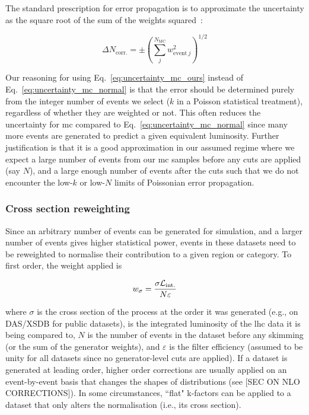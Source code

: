 The standard prescription for error propagation is to approximate the uncertainty as the square root of the sum of the weights squared~\cite{bevington2003data}:

\begin{equation}
\Delta N_{\mathrm{corr.}} = \pm \left( \sum_j^{N_{\mathrm{MC}}} w_{\mathrm{event} \ j}^2 \right) ^{1/2}
\label{eq:uncertainty_mc_normal}
\end{equation}

Our reasoning for using Eq.~\ref{eq:uncertainty_mc_ours} instead of Eq.~\ref{eq:uncertainty_mc_normal} is that the error should be determined purely from the integer number of events we select ($k$ in a Poisson statistical treatment), regardless of whether they are weighted or not. This often reduces the uncertainty for \acrshort{mc} compared to Eq.~\ref{eq:uncertainty_mc_normal} since many more events are generated to predict a given equivalent luminosity. Further justification is that it is a good approximation in our assumed regime where we expect a large number of events from our \acrshort{mc} samples before any cuts are applied (say $N$), and a large enough number of events after the cuts such that we do not encounter the low-$k$ or low-$N$ limits of Poissonian error propagation.




\subsubsection{Cross section reweighting}
\label{subsubsec:xs_weighting}

Since an arbitrary number of events can be generated for simulation, and a larger number of events gives higher statistical power, events in these datasets need to be reweighted to normalise their contribution to a given region or category. To first order, the weight applied is

\begin{equation}
w_{\sigma} = \frac{ \sigma \mathcal{L}_{\mathrm{int.}} }{ N \varepsilon }
\end{equation}

where $\sigma$ is the cross section of the process at the order it was generated (e.g., on DAS/XSDB for public datasets), \intlumi is the integrated luminosity of the \acrshort{lhc} data it is being compared to, $N$ is the number of events in the dataset before any skimming (or the sum of the generator weights), and $\varepsilon$ is the filter efficiency (assumed to be unity for all datasets since no generator-level cuts are applied). If a dataset is generated at leading order, higher order corrections are usually applied on an event-by-event basis that changes the shapes of distributions (see [SEC ON NLO CORRECTIONS]). In some circumstances, ``flat" k-factors can be applied to a dataset that only alters the normalisation (i.e., its cross section).


